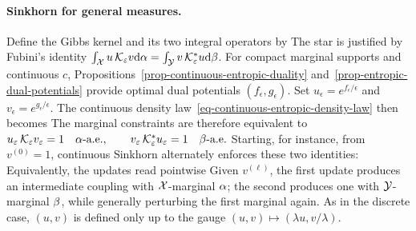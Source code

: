 \paragraph{Sinkhorn for general measures.}
Define the Gibbs kernel and its two integral operators by
The star is justified by Fubini's identity
\(
\int_{\mathcal{X}} u\,\mathcal K_\varepsilon v\mathrm{d}\alpha
=
\int_{\mathcal{Y}} v\,\mathcal K_\varepsilon^*u\mathrm{d}\beta
\).
For compact marginal supports and continuous $c$, Propositions~\ref{prop-continuous-entropic-duality} and~\ref{prop-entropic-dual-potentials} provide optimal dual potentials $(f_\epsilon,g_\epsilon)$. Set $u_\epsilon=e^{f_\epsilon/\epsilon}$ and $v_\epsilon=e^{g_\epsilon/\epsilon}$. The continuous density law~\eqref{eq-continuous-entropic-density-law} then becomes
The marginal constraints are therefore equivalent to
\(u_\varepsilon\,\mathcal K_\varepsilon v_\varepsilon=1 \quad \alpha\text{-a.e.}, \qquad v_\varepsilon\,\mathcal K_\varepsilon^*u_\varepsilon=1 \quad \beta\text{-a.e.}\)
Starting, for instance, from $v^{(0)}=1$, continuous Sinkhorn alternately enforces these two identities:
Equivalently, the updates read pointwise
Given $v^{(\ell)}$, the first update produces an intermediate coupling with $\mathcal{X}$-marginal $\alpha$; the second produces one with $\mathcal{Y}$-marginal $\beta$, while generally perturbing the first marginal again. As in the discrete case, $(u,v)$ is defined only up to the gauge $(u,v)\mapsto(\lambda u,v/\lambda)$.

